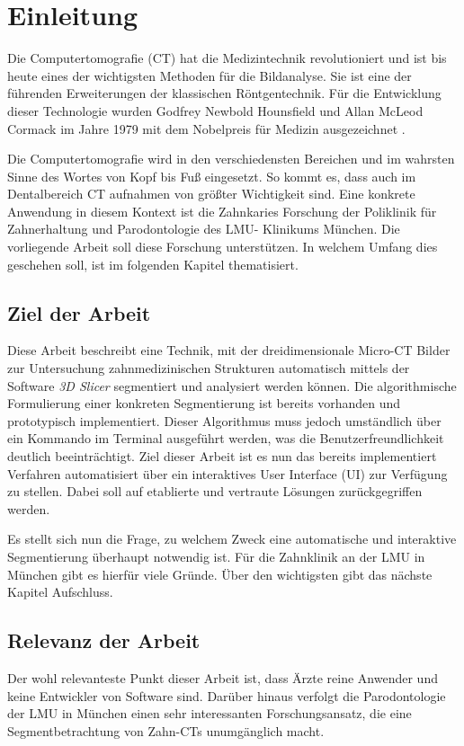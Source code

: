 \chapter{Einleitung}
\label{chap:einleitung} Die Computertomografie (CT) hat die Medizintechnik revolutioniert
und ist bis heute eines der wichtigsten Methoden für die Bildanalyse. Sie ist
eine der führenden Erweiterungen der klassischen Röntgentechnik. Für die Entwicklung
dieser Technologie wurden Godfrey Newbold Hounsfield und Allan McLeod Cormack im
Jahre 1979 mit dem Nobelpreis für Medizin ausgezeichnet \citep[Seite12]{handels2000}.

Die Computertomografie wird in den verschiedensten Bereichen und im wahrsten Sinne
des Wortes von Kopf bis Fuß eingesetzt. So kommt es, dass auch im Dentalbereich CT
aufnahmen von größter Wichtigkeit sind. Eine konkrete Anwendung in diesem
Kontext ist die Zahnkaries Forschung der Poliklinik für Zahnerhaltung und
Parodontologie des LMU- Klinikums München. Die vorliegende Arbeit soll diese
Forschung unterstützen. In welchem Umfang dies geschehen soll, ist im folgenden
Kapitel thematisiert.

\section{Ziel der Arbeit}
\label{sec:ziel_der_arbeit} Diese Arbeit beschreibt eine Technik, mit der dreidimensionale
Micro-CT Bilder zur Untersuchung zahnmedizinischen Strukturen automatisch mittels
der Software \textit{3D Slicer} segmentiert und analysiert werden können. Die algorithmische
Formulierung einer konkreten Segmentierung ist bereits vorhanden und prototypisch
implementiert. Dieser Algorithmus muss jedoch umständlich über ein Kommando im
Terminal ausgeführt werden, was die Benutzerfreundlichkeit deutlich beeinträchtigt.
Ziel dieser Arbeit ist es nun das bereits implementiert Verfahren automatisiert
über ein interaktives User Interface (UI) zur Verfügung zu stellen. Dabei soll auf
etablierte und vertraute Lösungen zurückgegriffen werden.

Es stellt sich nun die Frage, zu welchem Zweck eine automatische und interaktive
Segmentierung überhaupt notwendig ist. Für die Zahnklinik an der LMU in München gibt
es hierfür viele Gründe. Über den wichtigsten gibt das nächste Kapitel
Aufschluss.

\section{Relevanz der Arbeit}
\label{sec:relevanz_der_arbeit} Der wohl relevanteste Punkt dieser Arbeit ist, dass
Ärzte reine Anwender und keine Entwickler von Software sind. Darüber hinaus
verfolgt die Parodontologie der LMU in München einen sehr interessanten
Forschungsansatz, die eine Segmentbetrachtung von Zahn-CTs unumgänglich macht.

